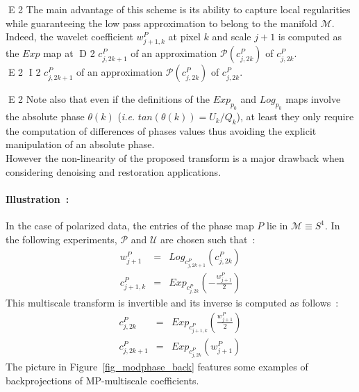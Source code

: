E 2
The main advantage of this scheme is its ability to capture local regularities while guaranteeing the low pass approximation to belong to 
the manifold $\mathcal{M}$. Indeed, the wavelet coefficient $w_{j+1,k}^P$ at pixel $k$ and scale $j+1$ is computed as the $Exp$ map at 
D 2
$c_{j,2k+1}^P$ of an approximation $\mathcal{P}(c_{j,2k}^P)$ of $c_{j,2k}^P$.\\
E 2
I 2
$c_{j,2k+1}^P$ of an approximation $\mathcal{P}(c_{j,2k}^P)$ of $c_{j,2k}^P$.

E 2
Note also that even if the definitions of the $Exp_{p_0}$ and $Log_{p_0}$ maps involve the absolute phase $\theta(k)$ (\textit{i.e.} $tan(\theta(k)) = U_k/Q_k$), 
at least they only require the computation of differences of phases values thus avoiding the explicit manipulation of an absolute phase.\\
However the non-linearity of the proposed transform is a major drawback when considering denoising and restoration applications.\\ 

\paragraph{Illustration~:\\}
In the case of polarized data, the entries of the phase map $P$ lie in $\mathcal{M} \equiv S^1$. In the following experiments, $\mathcal{P}$ and $\mathcal{U}$ are chosen such that~:
\begin{eqnarray}
w_{j+1}^P & = & Log_{c_{j,2k+1}^P}(c_{j,2k}^P)  \\
c_{j+1,k}^P & = & Exp_{c_{j,2k}^P} \left( - \frac{w_{j+1}^P}{2}\right)
\end{eqnarray}
This multiscale transform is invertible and its inverse is computed as follows~:
\begin{eqnarray}
c_{j,2k}^P & = & Exp_{c_{j+1,k}^P} \left(\frac{w_{j+1}^P}{2}\right)\\
c_{j,2k+1}^P & = & Exp_{c_{j,2k}^P}\left( w_{j+1}^P \right)   
\end{eqnarray}
The picture in Figure~\ref{fig_modphase_back} features some examples of backprojections of MP-multiscale coefficients.

